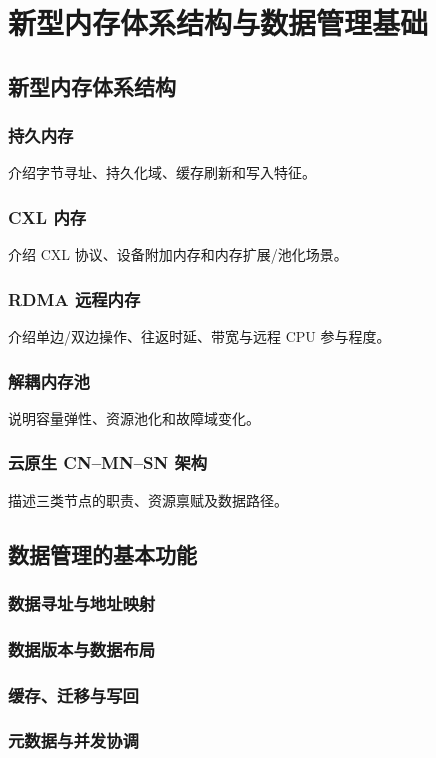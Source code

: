 \chapter{新型内存体系结构与数据管理基础}

\section{新型内存体系结构}
\subsection{持久内存}
介绍字节寻址、持久化域、缓存刷新和写入特征。
\subsection{CXL 内存}
介绍 CXL 协议、设备附加内存和内存扩展/池化场景。
\subsection{RDMA 远程内存}
介绍单边/双边操作、往返时延、带宽与远程 CPU 参与程度。
\subsection{解耦内存池}
说明容量弹性、资源池化和故障域变化。
\subsection{云原生 CN--MN--SN 架构}
描述三类节点的职责、资源禀赋及数据路径。

\section{数据管理的基本功能}
\subsection{数据寻址与地址映射}
\subsection{数据版本与数据布局}
\subsection{缓存、迁移与写回}
\subsection{元数据与并发协调}

